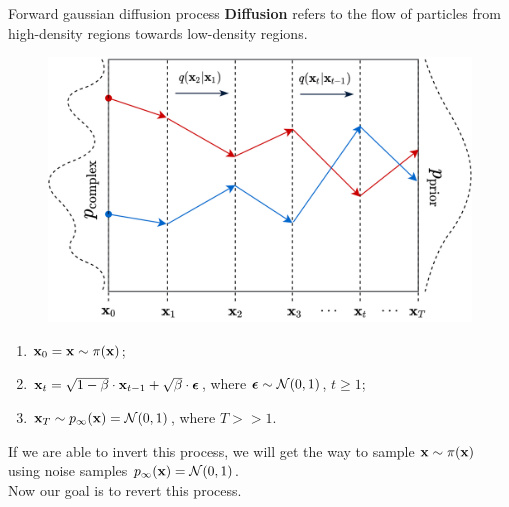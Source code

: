 \begin{frame}{Forward gaussian diffusion process}
	\textbf{Diffusion} refers to the flow of particles from high-density regions towards low-density regions.
	\vspace{-0.2cm}
	\begin{figure}
		\includegraphics[width=0.5\linewidth]{figs/diffusion_over_time}
	\end{figure}
	\vspace{-0.6cm}
	\begin{enumerate}
		\item $\mathbf{x}_0 = \mathbf{x} \sim \pi(\mathbf{x})$;
		\item $\mathbf{x}_t = \sqrt{1 - \beta} \cdot \mathbf{x}_{t - 1} + \sqrt{\beta} \cdot \boldsymbol{\epsilon}$, where $\boldsymbol{\epsilon} \sim \mathcal{N}(0, 1)$, $t \geq 1$;
		\item $\mathbf{x}_T \sim p_{\infty}(\mathbf{x}) = \mathcal{N}(0, 1)$, where $T >> 1$.
	\end{enumerate}
	If we are able to invert this process, we will get the way to sample $\mathbf{x} \sim \pi(\mathbf{x})$ using noise samples $p_{\infty}(\mathbf{x}) = \mathcal{N}(0, 1)$. \\ 
	Now our goal is to revert this process.
\end{frame}
